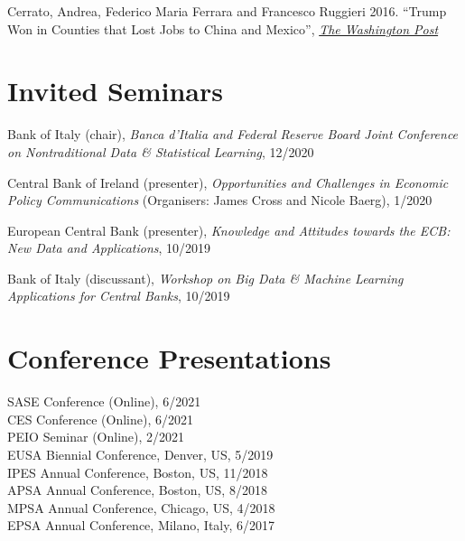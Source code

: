 \documentclass[margin, line]{res}
\begin{document}
\begin{resume}
\begin{hangparas}{0.17in}{1}
Cerrato, Andrea, Federico Maria Ferrara and Francesco Ruggieri 2016. ``Trump Won in Counties that Lost Jobs to China and Mexico'', \href{https://www.washingtonpost.com/news/monkey-cage/wp/2016/12/02/trump-won-where-import-shocks-from-china-and-mexico-were-strongest/?postshare=2681480673478579&tid=ss_fb-bottom&utm_term=.7cf92c84564b}{\textit{The Washington Post}}
\end{hangparas}

\section{\sc Invited Seminars}

\begin{hangparas}{0.17in}{1}
Bank of Italy (chair), \textit{Banca d'Italia and Federal Reserve Board Joint Conference on Nontraditional Data \& Statistical Learning}, 12/2020
\end{hangparas}
\begin{hangparas}{0.17in}{1}
Central Bank of Ireland (presenter), \textit{Opportunities and Challenges in Economic Policy Communications} (Organisers: James Cross and Nicole Baerg), 1/2020
\end{hangparas}
\begin{hangparas}{0.17in}{1}
European Central Bank (presenter), \textit{Knowledge and Attitudes towards the ECB: New Data and Applications}, 10/2019
\end{hangparas}
\begin{hangparas}{0.17in}{1}
Bank of Italy (discussant), \textit{Workshop on Big Data \& Machine Learning Applications for Central Banks}, 10/2019
\end{hangparas}

\section{\sc Conference Presentations}

SASE Conference (Online), 6/2021\\
CES Conference (Online), 6/2021\\
PEIO Seminar (Online), 2/2021\\
EUSA Biennial Conference, Denver, US, 5/2019\\
IPES Annual Conference, Boston, US, 11/2018\\
APSA Annual Conference, Boston, US, 8/2018\\
MPSA Annual Conference, Chicago, US, 4/2018\\
EPSA Annual Conference, Milano, Italy, 6/2017


\end{resume}
\end{document}
